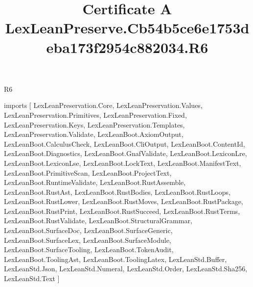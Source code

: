 \begin{lexlean}{R6}
\title{Certificate A LexLeanPreserve.Cb54b5ce6e1753deba173f2954c882034.R6}
\begin{coremodule}
imports [
  LexLeanPreservation.Core,
  LexLeanPreservation.Values,
  LexLeanPreservation.Primitives,
  LexLeanPreservation.Fixed,
  LexLeanPreservation.Keys,
  LexLeanPreservation.Templates,
  LexLeanPreservation.Validate,
  LexLeanBoot.AxiomOutput,
  LexLeanBoot.CalculusCheck,
  LexLeanBoot.CliOutput,
  LexLeanBoot.ContentId,
  LexLeanBoot.Diagnostics,
  LexLeanBoot.GnafValidate,
  LexLeanBoot.LexiconLre,
  LexLeanBoot.LexiconLse,
  LexLeanBoot.LockText,
  LexLeanBoot.ManifestText,
  LexLeanBoot.PrimitiveScan,
  LexLeanBoot.ProjectText,
  LexLeanBoot.RuntimeValidate,
  LexLeanBoot.RustAssemble,
  LexLeanBoot.RustAst,
  LexLeanBoot.RustBodies,
  LexLeanBoot.RustLoops,
  LexLeanBoot.RustLower,
  LexLeanBoot.RustMoves,
  LexLeanBoot.RustPackage,
  LexLeanBoot.RustPrint,
  LexLeanBoot.RustSucceed,
  LexLeanBoot.RustTerms,
  LexLeanBoot.RustValidate,
  LexLeanBoot.StructuralGrammar,
  LexLeanBoot.SurfaceDoc,
  LexLeanBoot.SurfaceGeneric,
  LexLeanBoot.SurfaceLex,
  LexLeanBoot.SurfaceModule,
  LexLeanBoot.SurfaceTooling,
  LexLeanBoot.TokenAudit,
  LexLeanBoot.ToolingAst,
  LexLeanBoot.ToolingLatex,
  LexLeanStd.Buffer,
  LexLeanStd.Json,
  LexLeanStd.Numeral,
  LexLeanStd.Order,
  LexLeanStd.Sha256,
  LexLeanStd.Text
]


\end{coremodule}
\end{lexlean}

